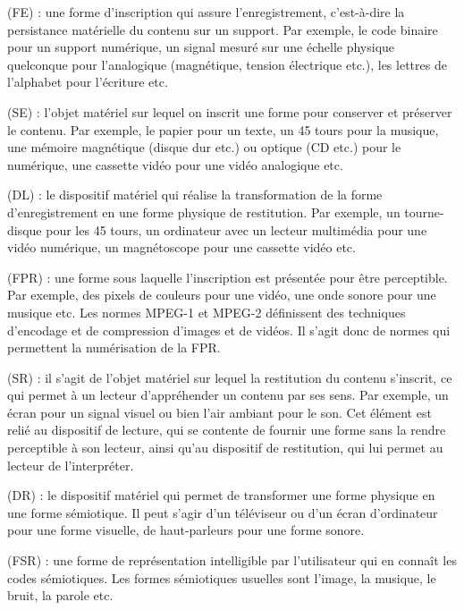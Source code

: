 	\begin{liste}
		\item {} (FE) : une forme d'inscription qui assure l'enregistrement, c'est-à-dire la persistance matérielle du contenu sur un support. 
		Par exemple, le code binaire pour un support numérique, un signal mesuré sur une échelle physique quelconque pour l'analogique (magnétique, tension électrique etc.), les lettres de l'alphabet pour l'écriture etc.

		\item {} (SE) : l'objet matériel sur lequel on inscrit une forme pour conserver et préserver le contenu.
		Par exemple, le papier pour un texte, un 45 tours pour la musique, une mémoire magnétique (disque dur etc.) ou optique (CD etc.) pour le numérique, une cassette vidéo pour une vidéo analogique etc.

		\item {} (DL) : le dispositif matériel qui réalise la transformation de la forme d'enregistrement en une forme physique de restitution.
		Par exemple, un tourne-disque pour les 45 tours, un ordinateur avec un lecteur multimédia pour une vidéo numérique, un magnétoscope pour une cassette vidéo etc.
	\end{liste}

	\begin{liste}
		\item {} (FPR) : une forme sous laquelle l'inscription est présentée pour être perceptible.
		Par exemple, des pixels de couleurs pour une vidéo, une onde sonore pour une musique etc.
		Les normes MPEG-1 et MPEG-2 définissent des techniques d'encodage et de compression d'images et de vidéos.
		Il s'agit donc de normes qui permettent la numérisation de la FPR.
		
		\item {} (SR) : il s'agit de l'objet matériel sur lequel la restitution du contenu s'inscrit, ce qui permet à un lecteur d'appréhender un contenu par ses sens. 
		Par exemple, un écran pour un signal visuel ou bien l'air ambiant pour le son.
		Cet élément est relié au dispositif de lecture, qui se contente de fournir une forme sans la rendre perceptible à son lecteur, ainsi qu'au dispositif de restitution, qui lui permet au lecteur de l'interpréter.
		
		\item {} (DR) : le dispositif matériel qui permet de transformer une forme physique en une forme sémiotique.
		Il peut s'agir d'un téléviseur ou d'un écran d'ordinateur pour une forme visuelle, de haut-parleurs pour une forme sonore.
		
		\item {} (FSR) : une forme de représentation intelligible par l'utilisateur qui en connaît les codes sémiotiques.
		Les formes sémiotiques usuelles sont l'image, la musique, le bruit, la parole etc.
	\end{liste}


